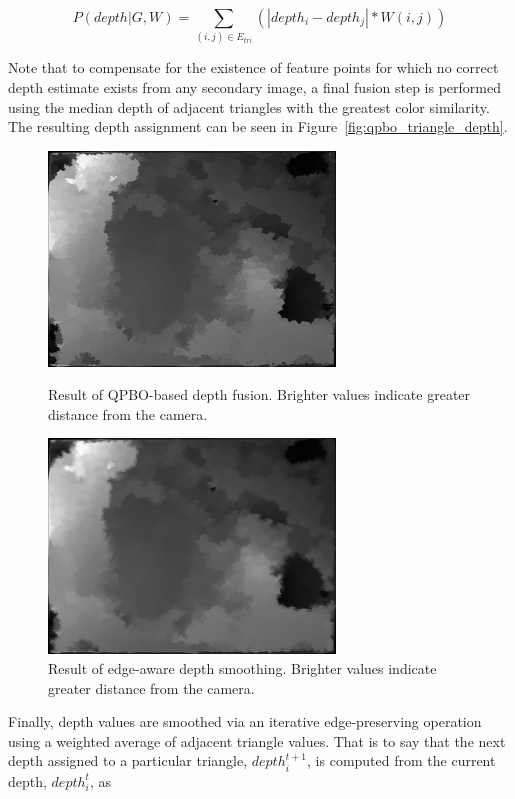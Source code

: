 \documentclass[conference]{acmsiggraph}
\begin{document}
\begin{equation}
    \label{eq:mrf}
    P(depth |G, W) = \sum_{(i, j) \in E_{tri}}
    \left(
        |depth_i - depth_j| * W(i, j)
    \right)
\end{equation}

Note that to compensate for the existence of feature points
for which no correct depth estimate exists from any
secondary image, a final fusion step is performed
using the median depth of adjacent triangles with
the greatest color similarity. The resulting depth
assignment can be seen in Figure~\ref{fig:qpbo_triangle_depth}.

\begin{figure}[ht]
  \centering
  \includegraphics[width=3in]{images/qpbo_triangle_depth}
  \caption{Result of QPBO-based depth fusion.  Brighter 
  values indicate greater distance from the camera.}
  \label{fig:qpbo_triangle_depth}
  \includegraphics[width=3in]{images/qpbo_smoothed_triangle_depth}
  \caption{Result of edge-aware depth smoothing.  Brighter 
  values indicate greater distance from the camera.}
  \label{fig:smooth_triangle_depth}
\end{figure}

Finally, depth values are smoothed via an iterative edge-preserving
operation using a weighted average of adjacent triangle values.
That is to say that the next depth assigned to a particular triangle, $depth_i^{t+1}$,
is computed from the current depth, $depth_i^t$, as
\end{document}
